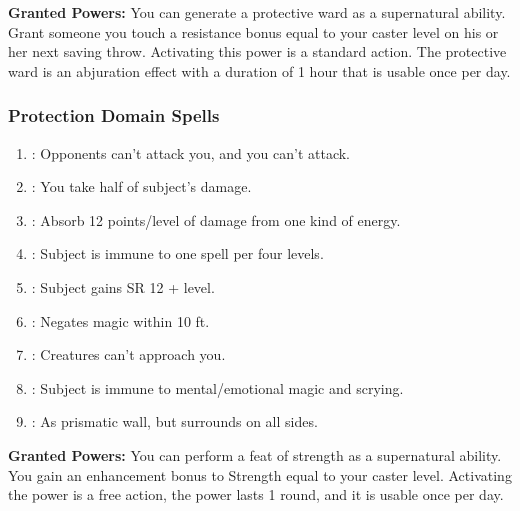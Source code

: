 \textbf{Granted Powers:} You can generate a protective ward as a supernatural ability. Grant someone you touch a resistance bonus equal to your caster level on his or her next saving throw. Activating this power is a standard action. The protective ward is an abjuration effect with a duration of 1 hour that is usable once per day.
\subsubsection{Protection Domain Spells}
\begin{enumerate}
	\item{:} Opponents can’t attack you, and you can’t attack.
	\item{:} You take half of subject’s damage.
	\item{:} Absorb 12 points/level of damage from one kind of energy.
	\item{:} Subject is immune to one spell per four levels.
	\item{:} Subject gains SR 12 + level.
	\item{:} Negates magic within 10 ft.
	\item{:} Creatures can’t approach you.
	\item{:} Subject is immune to mental/emotional magic and scrying.
	\item{:} As prismatic wall, but surrounds on all sides.
\end{enumerate}

\textbf{Granted Powers:} You can perform a feat of strength as a supernatural ability. You gain an enhancement bonus to Strength equal to your caster level. Activating the power is a free action, the power lasts 1 round, and it is usable once per day.
